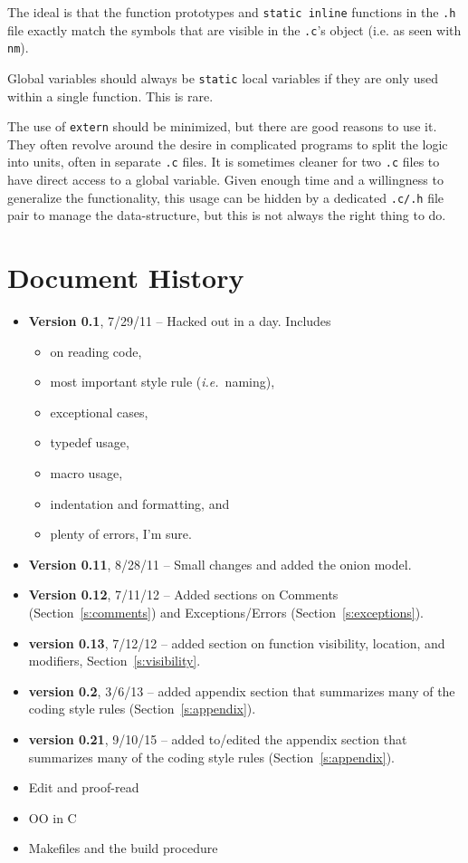 \documentclass[11pt,onecolumn]{article}
\def\ie{\textit{i.e.}}
\newcommand{\head}[1]{\vspace{0.4em}\noindent{\bf #1}}
\newcommand{\lsthead}[1]{{\bf #1}}
\begin{document}
The ideal is that the function prototypes and {\tt static inline}
functions in the {\tt .h} file exactly match the symbols that are
visible in the {\tt .c}'s object (i.e. as seen with {\tt nm}).

Global variables should always be {\tt static} local variables if they
are only used within a single function.  This is rare.

The use of {\tt extern} should be minimized, but there are good
reasons to use it.  They often revolve around the desire in complicated
programs to split the logic into units, often in separate {\tt .c}
files.  It is sometimes cleaner for two {\tt .c} files to have direct
access to a global variable.  Given enough time and a willingness to
generalize the functionality, this usage can be hidden by a dedicated
{\tt .c/.h} file pair to manage the data-structure, but this is not
always the right thing to do.

\newpage
\section{Document History}
\label{s:hist}

\begin{itemize}
\item \lsthead{Version 0.1}, 7/29/11 -- Hacked out in a day.  Includes
\begin{itemize}[itemsep=0pt,topsep=1pt,parsep=1pt,leftmargin=2.5em]
\item on reading code,
\item most important style rule (\ie\ naming),
\item exceptional cases,
\item typedef usage,
\item macro usage,
\item indentation and formatting, and
\item plenty of errors, I'm sure.
\end{itemize}
\item \lsthead{Version 0.11}, 8/28/11 -- Small changes and added the
  onion model.
\item \lsthead{Version 0.12}, 7/11/12 -- Added sections on Comments
  (Section~\ref{s:comments}) and Exceptions/Errors
  (Section~\ref{s:exceptions}).
\item \lsthead{version 0.13}, 7/12/12 -- added section on function
  visibility, location, and modifiers, Section~\ref{s:visibility}.
\item \lsthead{version 0.2}, 3/6/13 -- added appendix section that
  summarizes many of the coding style rules
  (Section~\ref{s:appendix}).
\item \lsthead{version 0.21}, 9/10/15 -- added to/edited the appendix
  section that summarizes many of the coding style rules
  (Section~\ref{s:appendix}).
\end{itemize}

\head{TODO}
\begin{itemize}[itemsep=0pt,topsep=1pt,parsep=1pt,leftmargin=2.5em]
\item Edit and proof-read
\item OO in C
\item Makefiles and the build procedure
\end{itemize}
\end{document}
